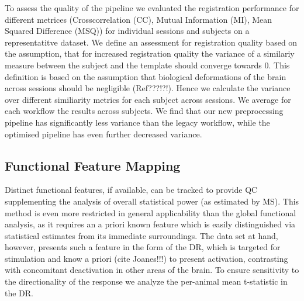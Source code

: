 
To assess the quality of the pipeline we evaluated the registration performance for different metrices (Crosscorrelation (CC), Mutual Information (MI), Mean Squared Difference (MSQ)) for individual sessions and subjects on a representatitve dataset.
We define an assessment for registration quality based on the assumption, that for increased registration quality the variance of a similariy measure between the subject and the template should converge towards 0.
This definition is based on the assumption that biological deformations of the brain across sessions should be negligible (Ref???!?!).
Hence we calculate the variance over different similiarity metrics for each subject across sessions.
We average for each workflow the results across subjects.
We find that our new preprocessing pipeline has significantly less variance than the legacy workflow, while the optimised pipeline has even further decreased variance.

\subsection{Functional Feature Mapping}

Distinct functional features, if available, can be tracked to provide QC supplementing the analysis of overall statistical power (as estimated by MS).
This method is even more restricted in general applicability than the global functional analysis, as it requires an a priori known feature which is easily distinguished via statistical estimates from its immediate surroundings.
The data set at hand, however, presents such a feature in the form of the DR, which is targeted for stimulation and know a priori (cite Joanes!!!) to present activation, contrasting with concomitant deactivation in other areas of the brain. 
To ensure sensitivity to the directionality of the response we analyze the per-animal mean t-statistic in the DR.

\begin{sansmath}
\end{sansmath}


